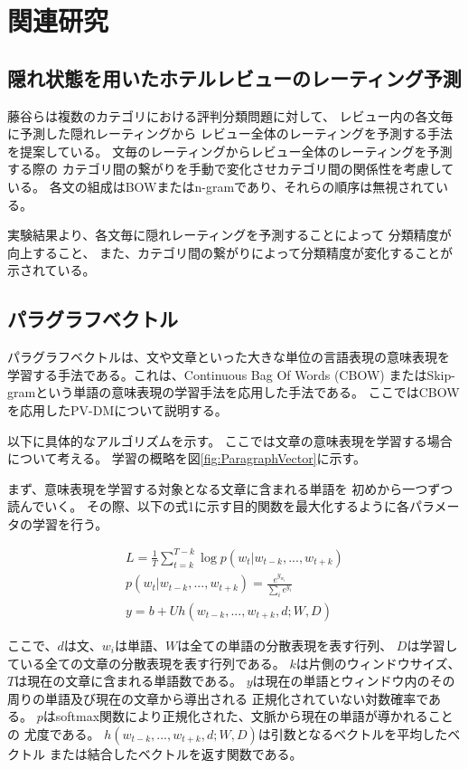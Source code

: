\documentclass[twocolumn,a4paper]{ltjarticle}
\begin{document}
\section{関連研究}

\subsection{隠れ状態を用いたホテルレビューのレーティング予測}

藤谷ら\cite{fujitani15}は複数のカテゴリにおける評判分類問題に対して、
レビュー内の各文毎に予測した隠れレーティングから
レビュー全体のレーティングを予測する手法を提案している。
文毎のレーティングからレビュー全体のレーティングを予測する際の
カテゴリ間の繋がりを手動で変化させカテゴリ間の関係性を考慮している。
各文の組成はBOWまたはn-gramであり、それらの順序は無視されている。

実験結果より、各文毎に隠れレーティングを予測することによって
分類精度が向上すること、
また、カテゴリ間の繋がりによって分類精度が変化することが示されている。


\subsection{パラグラフベクトル}

パラグラフベクトルは、文や文章といった大きな単位の言語表現の意味表現を
学習する手法である。これは、Continuous Bag Of Words (CBOW)
またはSkip-gramという単語の意味表現の学習手法を応用した手法である。
ここではCBOWを応用したPV-DMについて説明する。

以下に具体的なアルゴリズムを示す。
ここでは文章の意味表現を学習する場合について考える。
学習の概略を図\ref{fig:ParagraphVector}に示す。

まず、意味表現を学習する対象となる文章に含まれる単語を
初めから一つずつ読んでいく。
その際、以下の式1に示す目的関数を最大化するように各パラメータの学習を行う。

\begin{gather}
  L = \frac{1}{T} \sum^{T - k}_{t = k} \log p(w_t | w_{t-k}, ..., w_{t+k}) \\
  p(w_t | w_{t-k}, ..., w_{t+k}) = \frac{e^{y_{w_t}}}{\sum_i e^{y_i}} \\
  y = b + Uh(w_{t-k}, ..., w_{t+k}, d; W, D)
\end{gather}

ここで、$d$は文、$w_i$は単語、$W$は全ての単語の分散表現を表す行列、
$D$は学習している全ての文章の分散表現を表す行列である。
$k$は片側のウィンドウサイズ、
$T$は現在の文章に含まれる単語数である。
$y$は現在の単語とウィンドウ内のその周りの単語及び現在の文章から導出される
正規化されていない対数確率である。
$p$はsoftmax関数により正規化された、文脈から現在の単語が導かれることの
尤度である。
$h(w_{t-k}, ..., w_{t+k}, d; W, D)$は引数となるベクトルを平均したベクトル
または結合したベクトルを返す関数である。
\end{document}
